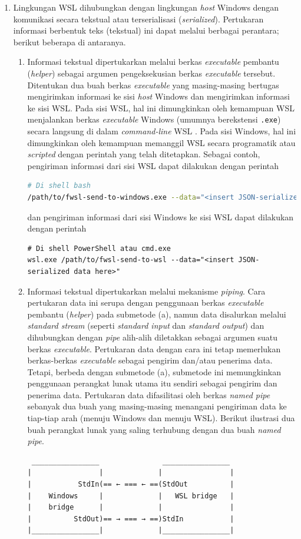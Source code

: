 \begin{enumerate}
    \item Lingkungan WSL dihubungkan dengan lingkungan \textit{host} Windows dengan komunikasi secara tekstual atau terserialisasi (\textit{serialized}). Pertukaran informasi berbentuk teks (tekstual) ini dapat melalui berbagai perantara; berikut beberapa di antaranya.
    \begin{enumerate}
        \item Informasi tekstual dipertukarkan melalui berkas \textit{executable} pembantu (\textit{helper}) sebagai argumen pengeksekusian berkas \textit{executable} tersebut. Ditentukan dua buah berkas \textit{executable} yang masing-masing bertugas mengirimkan informasi ke sisi \textit{host} Windows dan mengirimkan informasi ke sisi WSL. Pada sisi WSL, hal ini dimungkinkan oleh kemampuan WSL menjalankan berkas \textit{executable} Windows (umumnya berekstensi \verb|.exe|) secara langsung di dalam \textit{command-line} WSL \cite{msdocs-run-windows-tools-from-linux}. Pada sisi Windows, hal ini dimungkinkan oleh kemampuan memanggil WSL secara programatik atau \textit{scripted} dengan perintah yang telah ditetapkan. Sebagai contoh, pengiriman informasi dari sisi WSL dapat dilakukan dengan perintah
        \begin{lstlisting}[language=bash]
# Di shell bash
/path/to/fwsl-send-to-windows.exe --data="<insert JSON-serialized data here>"\end{lstlisting}
        dan pengiriman informasi dari sisi Windows ke sisi WSL dapat dilakukan dengan perintah
        \begin{lstlisting}
# Di shell PowerShell atau cmd.exe
wsl.exe /path/to/fwsl-send-to-wsl --data="<insert JSON-serialized data here>"\end{lstlisting}

        \item Informasi tekstual dipertukarkan melalui mekanisme \textit{piping}. Cara pertukaran data ini serupa dengan penggunaan berkas \textit{executable} pembantu (\textit{helper}) pada submetode (a), namun data disalurkan melalui \textit{standard stream} (seperti \textit{standard input} dan \textit{standard output}) dan dihubungkan dengan \textit{pipe} alih-alih diletakkan sebagai argumen suatu berkas \textit{executable}. Pertukaran data dengan cara ini tetap memerlukan berkas-berkas \textit{executable} sebagai pengirim dan/atau penerima data. Tetapi, berbeda dengan submetode (a), submetode ini memungkinkan penggunaan perangkat lunak utama itu sendiri sebagai pengirim dan penerima data. Pertukaran data difasilitasi oleh berkas \textit{named pipe} sebanyak dua buah yang masing-masing menangani pengiriman data ke tiap-tiap arah (menuju Windows dan menuju WSL). Berikut ilustrasi dua buah perangkat lunak yang saling terhubung dengan dua buah \textit{named pipe}.
        \begin{verbatim}
 ________________               ________________
|                |             |                |
|           StdIn(== ← === ← ==(StdOut          |
|    Windows     |             |   WSL bridge   |
|    bridge      |             |                |
|          StdOut)== → === → ==)StdIn           |
|________________|             |________________|


\end{verbatim}
\end{enumerate}
\end{enumerate}
